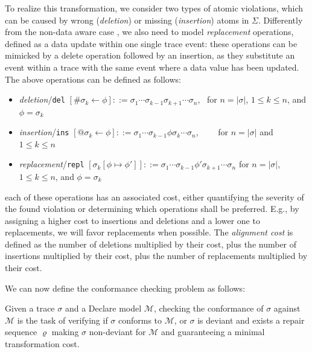 To realize this transformation, we consider two types of atomic violations, which can be caused by wrong (\textit{deletion}) or missing (\textit{insertion}) atoms in $\Sigma$. Differently from the non-data aware case \cite{XuLZ17a}, we also need to model \textit{replacement} operations, defined as a data update within one single trace event: these operations can be mimicked by a delete operation followed by an insertion, as they substitute an event within a trace with the same event where a data value has been updated. The above operations can be defined as follows:
\begin{itemize}
	\item \textit{deletion}/\texttt{del} $[\#\sigma_k\leftarrow \phi]::= \sigma_1\cdots\sigma_{k-1}\sigma_{k+1}\cdots \sigma_n$,\,\,\, for $n=|\sigma|$, $1\leq k\leq n$, and $\phi=\sigma_k$
	\item \textit{insertion}/\texttt{ins} $[@\sigma_k\leftarrow \phi]::= \sigma_1\cdots\sigma_{k-1}\phi\sigma_{k}\cdots \sigma_n$,\,\,\,\,\,\,\,\,\,\,\,\, for $n=|\sigma|$ and $1\leq k\leq n$
	\item \textit{replacement}/\texttt{repl} $[\sigma_k[\phi\mapsto\phi']]::=\sigma_1\cdots \sigma_{k-1}\phi'\sigma_{k+1}\cdots\sigma_n$ for $n=|\sigma|$, $1\leq k\leq n$, and $\phi=\sigma_k$
\end{itemize}
 each of these operations has an associated cost, either quantifying the severity of the found violation or determining which operations shall be preferred. E.g., by assigning a higher cost to insertions and deletions and a lower one to replacements, we will favor replacements when possible. The \textit{alignment cost} is defined as the number of deletions multiplied by their cost, plus the number of insertions multiplied by their cost, plus the number of replacements multiplied by their cost.

We can now define the conformance checking problem as follows:
\begin{definition}
Given a trace $\sigma$ and a Declare model $\mathcal{M}$, checking the conformance of $\sigma$ against $\mathcal{M}$ is the task of verifying if $\sigma$ conforms to $\mathcal{M}$, or $\sigma$ is deviant and  exists a repair sequence $\varrho$ making $\sigma$ non-deviant for $\mathcal{M}$ and guaranteeing a minimal transformation cost.
\end{definition}

